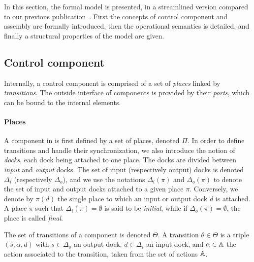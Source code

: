In this section, the \mad formal model is presented, in a streamlined
version compared to our previous
publication~\cite{chardet:hal-01858150}. First the concepts of control
component and assembly are formally introduced, then the operational
semantics is detailed, and finally a structural properties of the
model are given.

\subsection{Control component}
\label{sec:mod:comp}

Internally, a \mad control component is comprised of a set of \emph{places}
linked by \emph{transitions}. The outside interface of components is
provided by their \emph{ports}, which can be bound to the internal
elements.

\paragraph{Places}{

A component in \mad is first defined by a set of places, denoted
$\Pi$. In order to define transitions and handle their
synchronization, we also introduce the notion of \emph{docks}, each
dock being attached to one place. The docks are divided between
\emph{input} and \emph{output} docks. The set of input (respectively
output) docks is denoted $\Delta_i$ (respectively $\Delta_o$), and we
use the notations $\Delta_i (\pi)$ and $\Delta_o (\pi)$ to denote the
set of input and output docks attached to a given place
$\pi$. Conversely, we denote by $\pi(d)$ the single place to which an
input or output dock $d$ is attached. A place $\pi$ such that
$\Delta_i(\pi) = \emptyset$ is said to be \emph{initial}, while if
$\Delta_o(\pi) = \emptyset$, the place is called \emph{final}.

The set of transitions of a component is denoted
$\Theta$. A transition $\theta \in \Theta$ is a triple
$\left(s, \alpha, d\right)$ with $s\in\Delta_{o}$ an output dock,
$d\in\Delta_{i}$ an input dock, and $\alpha \in \mathbb{A}$ the action
associated to the transition, taken from the set of actions $\mathbb{A}$.
}

